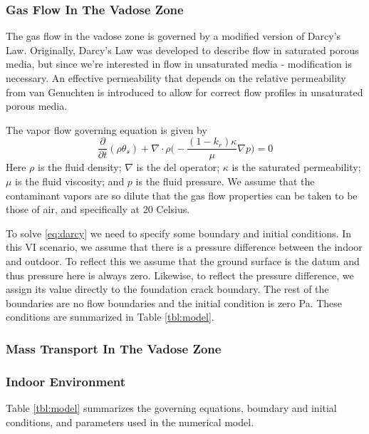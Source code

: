 \subsubsection{Gas Flow In The Vadose Zone}

The gas flow in the vadose zone is governed by a modified version of Darcy's Law.
Originally, Darcy's Law was developed to describe flow in saturated porous media, but since we're interested in flow in unsaturated media - modification is necessary.
An effective permeability that depends on the relative permeability from van Genuchten is introduced to allow for correct flow profiles in unsaturated porous media.\par

The vapor flow governing equation is given by
\begin{equation}\label{eq:darcy}
  \frac{\partial}{\partial t} (\rho \theta_s) + \nabla \cdot \rho \Big( -\frac{(1-k_r) \kappa}{\mu} \nabla p \Big) = 0
\end{equation}
Here $\rho$ is the fluid density; $\nabla$ is the del operator; $\kappa$ is the saturated permeability; $\mu$ is the fluid viscosity; and $p$ is the fluid pressure.
We assume that the contaminant vapors are so dilute that the gas flow properties can be taken to be those of air, and specifically at 20 Celsius.\par

To solve \eqref{eq:darcy} we need to specify some boundary and initial conditions.
In this VI scenario, we assume that there is a pressure difference between the indoor and outdoor.
To reflect this we assume that the ground surface is the datum and thus pressure here is always zero.
Likewise, to reflect the pressure difference, we assign its value directly to the foundation crack boundary.
The rest of the boundaries are no flow boundaries and the initial condition is zero Pa.
These conditions are summarized in Table \ref{tbl:model}.\par

\subsubsection{Mass Transport In The Vadose Zone}



\subsubsection{Indoor Environment}




Table \ref{tbl:model} summarizes the governing equations, boundary and initial conditions, and parameters used in the numerical model.
